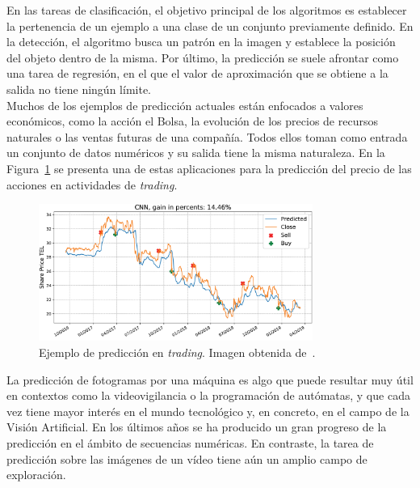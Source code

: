 En las tareas de clasificación, el objetivo principal de los algoritmos es establecer la pertenencia de un ejemplo a una clase de un conjunto previamente definido. En la detección, el algoritmo busca un patrón en la imagen y establece la posición del objeto dentro de la misma. Por último, la predicción se suele afrontar como una tarea de regresión, en el que el valor de aproximación que se obtiene a la salida no tiene ningún límite.\\

Muchos de los ejemplos de predicción actuales están enfocados a valores económicos, como la acción el Bolsa, la evolución de los precios de recursos naturales o las ventas futuras de una compañía. Todos ellos toman como entrada un conjunto de datos numéricos y su salida tiene la misma naturaleza. En la Figura~\ref{fig.trading} se presenta una de estas aplicaciones para la predicción del precio de las acciones en actividades de \textit{trading}.

\vspace{10pt}
\begin{figure}[H]
		\begin{center}
			\includegraphics[width=0.8\textwidth]{ figures/intro/trading.PNG}
			\caption{Ejemplo de predicción en \textit{trading}. Imagen obtenida de~\cite{2019PLoSO..1423593S}.}
			\label{fig.trading}
		\end{center}
\end{figure}
\vspace{-10pt}

La predicción de fotogramas por una máquina es algo que puede resultar muy útil en contextos como la videovigilancia o la programación de autómatas, y que cada vez tiene mayor interés en el mundo tecnológico y, en concreto, en el campo de la Visión Artificial. En los últimos años se ha producido un gran progreso de la predicción en el ámbito de secuencias numéricas. En contraste, la tarea de predicción sobre las imágenes de un vídeo tiene aún un amplio campo de exploración.\\


